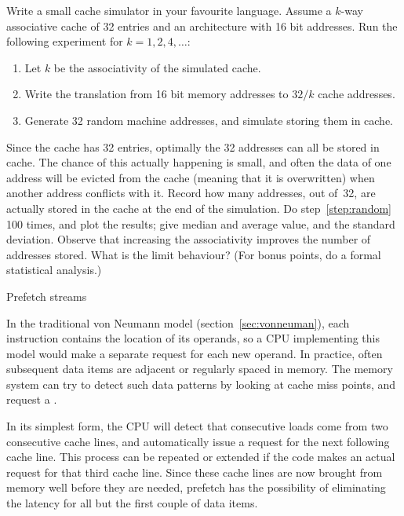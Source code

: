 \begin{exercise}
  Write a small cache simulator in your favourite language. Assume a
  $k$-way associative cache of 32 entries and an architecture with 16
  bit addresses. Run the following
  experiment for $k=1,2,4,\ldots$:
  \begin{enumerate}
  \item Let $k$ be the associativity of the simulated cache.
  \item Write the translation from 16 bit memory addresses to $32/k$ 
    cache addresses.
  \item\label{step:random} Generate 32 random machine addresses, and
    simulate storing them in cache.
  \end{enumerate}
  Since the cache has 32 entries, optimally the 32 addresses can all
  be stored in cache. The chance of this actually happening is small,
  and often the data of one address will be evicted from the cache
  (meaning that it is overwritten) when another address conflicts with
  it. Record how many addresses, out of~32, are actually stored in the
  cache at the end of the simulation. Do step~\ref{step:random} 100
  times, and plot the results; give median and average value, and the
  standard deviation. Observe that increasing the associativity
  improves the number of addresses stored. What is the limit
  behaviour? (For bonus points, do a formal statistical analysis.)
\end{exercise}


 {Prefetch streams}
\label{sec:prefetch}

In the traditional von Neumann model (section~\ref{sec:vonneuman}),
each instruction contains the location of its operands, so a CPU
implementing this model would make a separate request for each new
operand. In practice, often subsequent data items are adjacent or
regularly spaced in memory. The memory system can try to detect such
data patterns by looking at cache miss points,
and request a . 

In its simplest form, the CPU will detect that consecutive loads come
from two consecutive cache lines, and automatically issue a request
for the next following cache line. This process can be repeated or
extended if the code makes an actual request for that third cache
line. Since these cache lines are now brought from memory well before
they are needed, prefetch has the possibility of eliminating the
latency for all but the first couple of data items.

